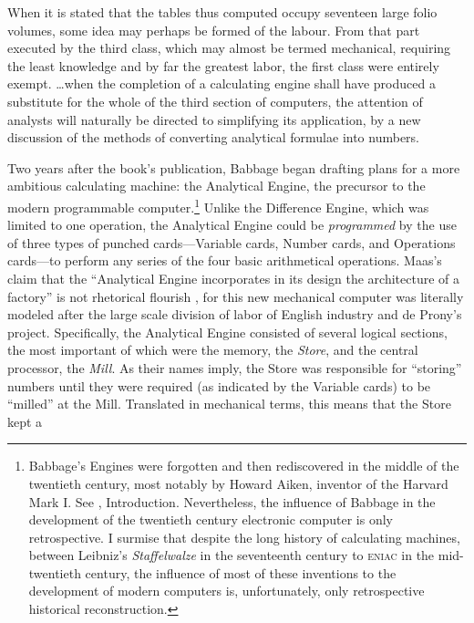 \documentclass[version=last,draft=false,paper=A4,portrait,twoside=true,twocolumn=false,headinclude=false,footinclude=false,mpinclude=true,fontsize=12,BCOR=20mm,DIV=calc,pagesize=auto,open=right,chapterprefix=true,numbers=autoendperiod,headsepline=false,headings=twolinechapter,parskip=false]{scrbook}
\begin{document}
\begin{displayquote}
When it is stated that the tables thus computed occupy seventeen large
folio volumes, some idea may perhaps be formed of the labour. From that
part executed by the third class, which may almost be termed mechanical,
requiring the least knowledge and by far the greatest labor, the first
class were entirely exempt. \ldots when the completion of a calculating
engine shall have produced a substitute for the whole of the third section
of computers, the attention of analysts will naturally be directed to
simplifying its application, by a new discussion of the methods of
converting analytical formulae into numbers.
\end{displayquote}

Two years after the book's publication, Babbage began drafting plans for a
more ambitious calculating machine: the Analytical Engine, the precursor to
the modern programmable computer.\footnote{Babbage's Engines were forgotten and then rediscovered in the
middle of the twentieth century, most notably by Howard Aiken, inventor of
the Harvard Mark I. See \textcite{aiken1946}, Introduction. Nevertheless, the
influence of Babbage in the development of the twentieth century electronic
computer is only retrospective. I surmise that despite the long history of
calculating machines, between Leibniz's \emph{Staffelwalze} in the seventeenth
century to \textsc{eniac} in the mid-twentieth century, the influence of
most of these inventions to the development of modern computers is,
unfortunately, only retrospective historical reconstruction.} Unlike the Difference Engine,
which was limited to one operation, the Analytical Engine could be
\emph{programmed} by the use of three types of punched cards---Variable cards,
Number cards, and Operations cards---to perform any series of the four
basic arithmetical operations. Maas's claim that the ``Analytical Engine
incorporates in its design the architecture of a factory'' is not
rhetorical flourish \autocite[109]{maas2005}, for this new mechanical
computer was literally modeled after the large scale division of labor of
English industry and de Prony's project. Specifically, the Analytical
Engine consisted of several logical sections, the most important of which
were the memory, the \emph{Store}, and the central processor, the \emph{Mill}. As their
names imply, the Store was responsible for ``storing'' numbers until they
were required (as indicated by the Variable cards) to be ``milled'' at the
Mill. Translated in mechanical terms, this means that the Store kept a
\end{document}
